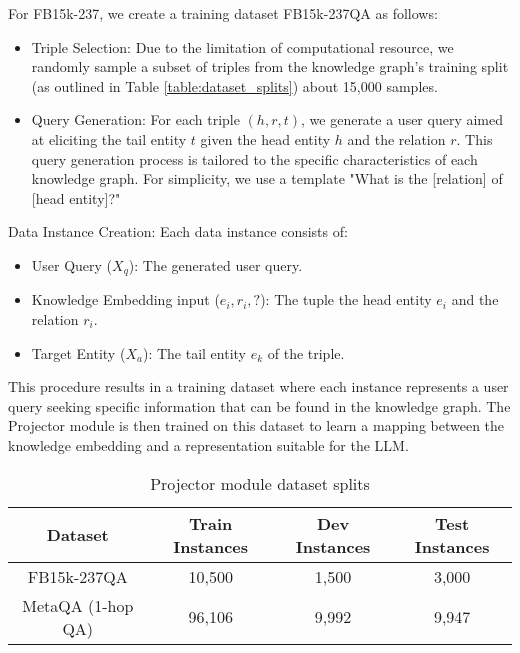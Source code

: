 For FB15k-237, we create a training dataset FB15k-237QA as follows:
\begin{itemize}

\item Triple Selection: Due to the limitation of computational resource, we randomly sample a subset of triples from the knowledge graph's training split (as outlined in Table \ref{table:dataset_splits}) about 15,000 samples.

\item Query Generation: For each triple $(h, r, t)$, we generate a user query aimed at eliciting the tail entity $t$ given the head entity $h$ and the relation $r$. This query generation process is tailored to the specific characteristics of each knowledge graph. For simplicity,  we use a template  "What is the [relation] of [head entity]?"

\end{itemize}

Data Instance Creation: Each data instance consists of:
\begin{itemize}
\item User Query ($X_q$): The generated user query.
\item Knowledge Embedding input ($e_i, r_i, ?$): The tuple the head entity $e_i$ and the relation $r_i$.
\item Target Entity ($X_a$): The tail entity $e_k$ of the triple.
\end{itemize}
This procedure results in a training dataset where each instance represents a user query seeking specific information that can be found in the knowledge graph. The Projector module is then trained on this dataset to learn a mapping between the knowledge embedding and a representation suitable for the LLM.

\begin{table}[hbt]
\centering
\caption{Projector module dataset splits}
\label{table:projector_dataset}
\begin{tabular}{|c|c|c|c|}
\hline
\textbf{Dataset} & \textbf{Train Instances} & \textbf{Dev Instances} & \textbf{Test Instances} \\
\hline
FB15k-237QA & 10,500 & 1,500 & 3,000 \\
\hline
MetaQA (1-hop QA) & 96,106 &  9,992 & 9,947 \\
\hline
\end{tabular}
\end{table}

